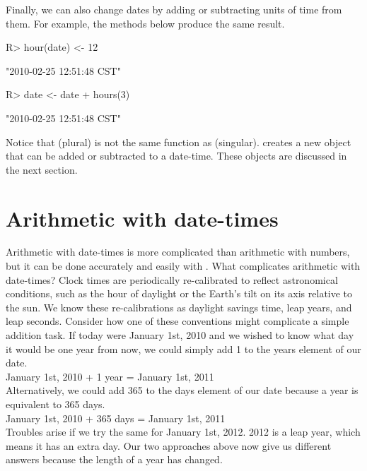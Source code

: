 \documentclass[article]{jss}
\begin{document}
Finally, we can also change dates by adding or subtracting units of time from them. For example, the methods below produce the same result.

\begin{CodeInput}
R> hour(date) <-  12 
\end{CodeInput}
\begin{CodeOutput}
[1] "2010-02-25 12:51:48 CST"
\end{CodeOutput}

\begin{CodeInput}
R> date <- date + hours(3) 
\end{CodeInput}
\begin{CodeOutput}
[1] "2010-02-25 12:51:48 CST"
\end{CodeOutput}

Notice that  (plural) is not the same function as  (singular).  creates a new object that can be added or subtracted to a  date-time. These objects are discussed in the next section. 

\section{Arithmetic with date-times}
\label{sec:types}
Arithmetic with date-times is more complicated than arithmetic with numbers, but it can be done accurately and easily with . What complicates arithmetic with date-times? Clock times are periodically re-calibrated to reflect astronomical conditions, such as the hour of daylight or the Earth's tilt on its axis relative to the sun. We know these re-calibrations as daylight savings time, leap years, and leap seconds. Consider how one of these conventions might complicate a simple addition task. If today were January 1st, 2010 and we wished to know what day it would be one year from now, we could simply add 1 to the years element of our date.\\

January 1st, 2010 + 1 year = January 1st, 2011\\

Alternatively, we could add 365 to the days element of our date because a year is equivalent to 365 days. \\

January 1st, 2010 + 365 days = January 1st, 2011\\

Troubles arise if we try the same for January 1st, 2012. 2012 is a leap year, which means it has an extra day. Our two approaches above now give us different answers because the length of a year has changed.\\ 
\end{document}
